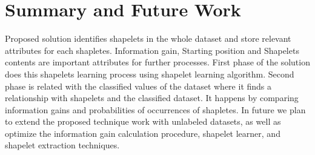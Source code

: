 \documentclass[conference]{IEEEtran}  %
\begin{document}
\section{Summary and Future Work}

Proposed solution identifies shapelets in the whole dataset and store relevant attributes for each shapletes. Information gain, Starting position and Shapelets contents are important attributes for further processes. First phase of the solution does this shapelets learning process using shapelet learning algorithm. Second phase is related with the classified values of the dataset where it finds a relationship with shapelets and the classified dataset. It happens by comparing information gains and probabilities of occurrences of shapletes. In future we plan to extend the proposed technique work with unlabeled datasets, as well as optimize the information gain calculation procedure, shapelet learner, and shapelet extraction techniques.

\nocite{*}


\end{document}
